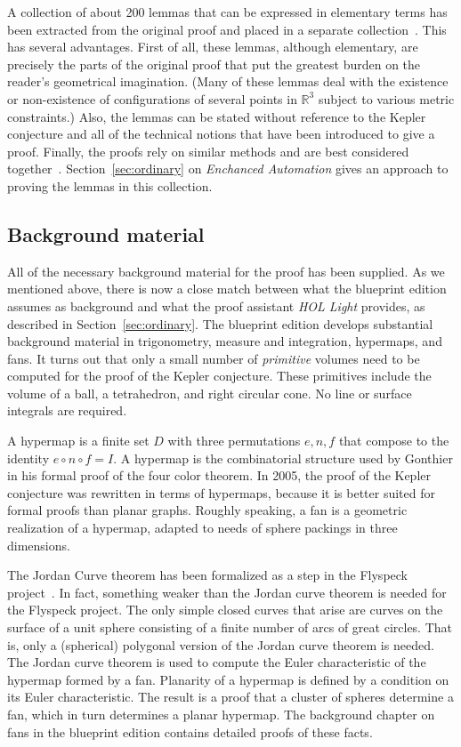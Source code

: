 \documentclass[11pt]{amsart}
\newcommand{\ring}[1]{\mathbb{#1}}
\begin{document}
A collection of about 200 lemmas that can be expressed in elementary terms has been extracted from 
the original proof and placed in a separate collection~\cite{hales:2008:collection}.  This has
several advantages.  First of all, these lemmas, although elementary, are precisely the parts of the
original proof that put the greatest burden on the reader's geometrical imagination.  (Many of these
lemmas deal with the existence or non-existence of configurations of several points in $\ring{R}^3$ subject to
various metric constraints.)  Also, the lemmas can be stated without reference to the Kepler conjecture and all of the
technical notions that have been introduced to give a proof.
Finally, the proofs rely on similar methods and are best considered
together~\cite{1271687}.  Section~\ref{sec:ordinary} on {\it Enchanced Automation} gives an approach to proving the lemmas in this collection.

 

\subsection*{Background material}

All of the necessary background material for the proof has been supplied.  As we mentioned above, there is now a close
match between what the blueprint edition assumes as background and what the proof assistant {\it HOL Light}
provides, as described in Section~\ref{sec:ordinary}.  The blueprint edition develops 
substantial background
material in trigonometry, measure and integration, hypermaps, and fans.   It turns out
that only a small number of {\it primitive} volumes need to be computed for the proof of the Kepler
conjecture. These primitives include the volume of a ball, a tetrahedron, and right circular cone.  
No line or surface integrals are required.

A hypermap is a finite set $D$ with three permutations $e,n,f$ that compose to the identity $e\circ n\circ f= I$.  A hypermap is the
combinatorial structure used by Gonthier in his formal proof of the four color theorem.  In 2005,
the proof of the Kepler conjecture was rewritten in terms of hypermaps, because it is better suited
for formal proofs than planar graphs.  Roughly speaking, a fan is a geometric realization of a hypermap,
adapted to needs of sphere packings in three dimensions.

The Jordan Curve theorem has been formalized as a step in the Flyspeck project~\cite{Hales:2007:jordan}.  In fact, something weaker than the Jordan curve theorem
is needed for the Flyspeck project.  The only simple closed curves that arise are curves on
the surface of a unit sphere consisting of a finite number of arcs of great circles.  That is,
only a (spherical) polygonal version of the Jordan curve theorem is needed.  The Jordan curve
theorem is used to compute the Euler characteristic of the hypermap formed by a fan.  Planarity of a hypermap is defined by a condition on its Euler characteristic.  The result is a proof that a cluster of spheres determine a fan, which in turn determines a planar hypermap.
The background chapter on fans in the blueprint edition contains detailed proofs of these facts.
\end{document}

